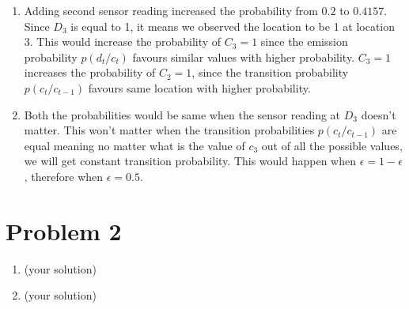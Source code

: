 \documentclass[12pt]{article}
\begin{document}
\begin{enumerate}[label=(\alph*)]
\begin{enumerate}[label=\roman*.]
  \item
  Adding second sensor reading increased the probability from $0.2$ to $0.4157$. Since $D_3$ is equal to 1, it means we observed the location to be 1 at location 3. This would increase the probability of $C_3 = 1$ since the emission probability $p(d_t/c_t)$ favours similar values with higher probability. $C_3 = 1$ increases the probability of $C_2 = 1$, since the transition probability $p(c_t/c_{t-1})$ favours same location with higher probability.
  \item Both the probabilities would be same when the sensor reading at $D_3$ doesn't matter. This won't matter when the transition probabilities $p(c_t/c_{t-1})$ are equal meaning no matter what is the value of $c_3$ out of all the possible values, we will get constant transition probability. This would happen when $\epsilon = 1 - \epsilon$, therefore when $\epsilon = 0.5$. 
  
  \end{enumerate}
\end{enumerate}

\section*{Problem 2}

\begin{enumerate}[label=(\alph*)]
  \item (your solution)
  \item (your solution)
\end{enumerate}
\end{document}
